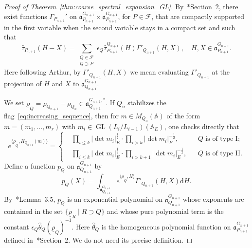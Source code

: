 \documentclass[letterpaper,11pt]{amsart}
\newcommand{\fa}{\mathfrak{a}}
\newcommand{\bA}{\mathbb{A}}
\newcommand{\cF}{\mathcal{F}}
\newcommand{\rd}{\mathrm{d}}
\newcommand{\<}{\negthickspace}
\DeclareMathOperator{\GL}{GL}
\theoremstyle{definition}
\theoremstyle{plain}
\theoremstyle{remark}
\numberwithin{equation}{section}
\begin{document}
\begin{proof}[Proof of Theorem~\ref{thm:coarse_spectral_expansion_GL}]

By~\cite{Arthur1}*{Section~2}, there exist functions $\Gamma_{P_{n+1}}'$ on
$\fa_{P_{n+1}}^{G_{n+1}} \times \fa_{P_{n+1}}^{G_{n+1}}$, for $P \in
\cF$, that are compactly supported in the first variable when
the second variable stays in a compact set and such that
    \begin{equation}    \label{eq:Gamma_Q'}
    \widehat{\tau}_{P_{n+1}}(H-X) = \sum_{ \substack{ Q \in \cF \\ Q \supset P }}
    \epsilon_{Q} \widehat{\tau}_{P_{n+1}}^{Q_{n+1}}(H)
    \Gamma'_{Q_{n+1}}(H, X), \quad H, X \in \fa_{P_{n+1}}^{G_{n+1}}.
    \end{equation}
Here following Arthur, by $\Gamma'_{Q_{n+1}}(H, X)$ we mean evaluating
$\Gamma'_{Q_{n+1}}$ at the projection of $H$ and $X$ to
$\fa_{Q_{n+1}}^{G_{n+1}}$.


We set $\underline{\rho}_Q=\rho_{Q_{n+1}}-\rho_{Q_n} \in
\fa_{Q_{n+1}}^{G_{n+1},*}$. If $Q_n$ stabilizes the
flag~\eqref{eq:increasing_sequence}, then for $m \in M_{Q_n}(\bA)$ of the form $m =
(m_1,\hdots,m_r)$ with $m_i \in \GL(L_{i}/L_{i-1})(\bA_E)$, one checks
directly that
    \begin{equation} \label{eq:underline_rho_Q_explicit}
    e^{\langle \underline{\rho}_Q, H_{Q_{n+1}}(m) \rangle}
    = \left\{ \begin{aligned}
    & \prod_{i \le k} \left|\det m_i\right|_E^{\frac{1}{2}} \cdot
    \prod_{i > k} \left|\det m_i\right|_E^{-\frac{1}{2}},
    &&\text{$Q$ is of type I};\\
    & \prod_{i \le k} \left|\det m_i\right|_E^{\frac{1}{2}} \cdot
    \prod_{i > k+1} \left|\det m_i\right|_E^{-\frac{1}{2}},
    &&\text{$Q$ is of type II}.
    \end{aligned} \right.
    \end{equation}
Define a function $p_Q$ on $\fa_{Q_{n+1}}^{G_{n+1}}$ by
    \begin{equation}    \label{eq:polynomial_exponential}
    p_Q(X) = \int_{\fa_{Q_{n+1}}^{G_{n+1}}}
    e^{\langle \underline{\rho}_Q, H \rangle} \Gamma'_{Q_{n+1}}(H,X) \rd H.
    \end{equation}
By~\cite{Zydor3}*{Lemma~3.5}, $p_Q$ is an exponential polynomial on
$\fa_{Q_{n+1}}^{G_{n+1}}$ whose exponents are contained in the set
$\{\underline{\rho}_R \mid R \supset Q \}$ and whose pure polynomial term is
the constant $\epsilon_Q \widehat{\theta}_Q(\underline{\rho}_Q)^{-1}$.
Here $\widehat{\theta}_Q$ is the homogeneous polynomial function on
$\fa_{P_{n+1}}^{G_{n+1}}$ defined in~\cite{Arthur1}*{Section~2}. We do not
need its precise definition.


\end{proof}
\end{document}
